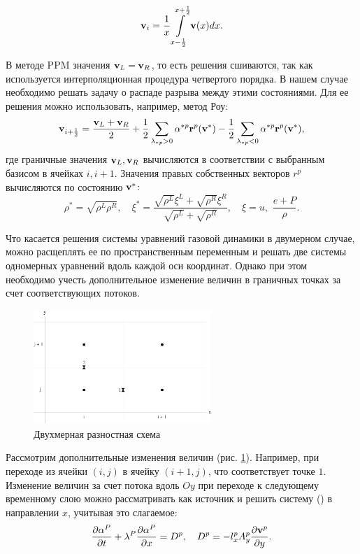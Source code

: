 \documentclass[12pt,a4paper]{article}
\newcommand{\picref}[1]{рис. \ref{#1}}
\newcommand{\half}{\frac{1}{2}}
\newcommand{\dhalf}{\dfrac{1}{2}}
\newcommand{\dpartial}[2]{\dfrac{ \partial #1 }{ \partial #2 }}
\begin{document}
    \newpage

    \[
        \bold v_i = \dfrac{1}{\Delta x} \int \limits_{x - \half}^{x + \half} \bold v(x) dx.
    \]

    В методе PPM значения $ \bold v_L = \bold v_R $, то есть решения сшиваются, так как используется интерполяционная процедура четвертого порядка. В нашем случае необходимо решать задачу о распаде разрыва между этими состояниями. Для ее решения можно использовать, например, метод Роу:
    \begin{equation}
        \label{row}
        \bold v_{i + \half} = \dfrac{\bold v_L + \bold v_R}{2} + \dhalf \sum_{\lambda_{*p} > 0} \alpha^{*p} \bold r^p (\bold v^*) - \dhalf \sum_{\lambda_{*p} < 0} \alpha^{*p} \bold r^p (\bold v^*),
    \end{equation}
    \noindent где граничные значения $ \bold v_L, \bold v_R $ вычисляются в соответствии с выбранным базисом в ячейках $ i, i + 1 $. Значения правых собственных векторов $ r^p $ вычисляются по состоянию $\bold v^* \colon$
    \[
        \rho^* = \sqrt{\rho^L \rho^R}, \quad \xi^* = \dfrac{\sqrt{\rho^L} \xi^L + \sqrt{\rho^R} \xi^R}{\sqrt{\rho^L} + \sqrt{\rho^R}}, \quad \xi = u,\,\, \dfrac{e + P}{\rho}.
    \]

    Что касается решения системы уравнений газовой динамики в двумерном случае, можно расщеплять ее по пространственным переменным и решать две системы одномерных уравнений вдоль каждой оси координат. Однако при этом необходимо учесть дополнительное изменение величин в граничных точках за счет соответствующих потоков.

    \begin{figure}[h]
        \centering
        \includegraphics[width=0.6\textwidth]{difference2d.pdf}
        \caption{Двухмерная разностная схема}
        \label{fig:difference2d}
    \end{figure}

    \pagebreak

    Рассмотрим дополнительные изменения величин (\picref{fig:difference2d}). Например, при переходе из ячейки $(i, j)$ в ячейку $(i+1, j)$, что соответствует точке $1$. Изменение величин за счет потока вдоль $Oy$ при переходе к следующему временному слою можно рассматривать как источник и решить систему () в направлении $x$, учитывая это слагаемое:
    \[
        \dpartial{\alpha^P}{t} + \lambda^P \dpartial{\alpha^P}{x} = D^p, \quad D^p = -l_x^p A_y^p \dpartial{\bold v^p}{y}.
    \]
\end{document}
